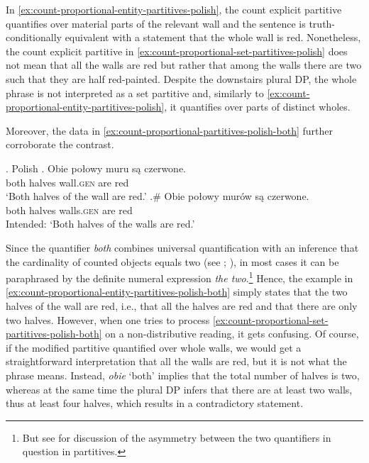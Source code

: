 In \ref{ex:count-proportional-entity-partitives-polish}, the count explicit partitive quantifies over material parts of the relevant wall and the sentence is truth-conditionally equivalent with a statement that the whole wall is red. Nonetheless, the count explicit partitive in \ref{ex:count-proportional-set-partitives-polish} does not mean that all the walls are red but rather that among the walls there are two such that they are half red-painted. Despite the downstairs plural DP, the whole phrase is not interpreted as a set partitive and, similarly to \ref{ex:count-proportional-entity-partitives-polish}, it quantifies over parts of distinct wholes.   

Moreover, the data in \ref{ex:count-proportional-partitives-polish-both} further corroborate the contrast.  

\ex.\label{ex:count-proportional-partitives-polish-both} Polish
\ag. Obie połowy muru są czerwone.\label{ex:count-proportional-entity-partitives-polish-both}\\
both halves wall\textsc{.gen} are red\\
`Both halves of the wall are red.'
\bg.\# Obie połowy murów są czerwone.\label{ex:count-proportional-set-partitives-polish-both}\\
both halves walls\textsc{.gen} are red\\
Intended: `Both halves of the walls are red.'

Since the quantifier \textit{both} combines universal quantification with an inference that the cardinality of counted objects equals two (see \citealt{barwise_cooper1981generalized}; \citealt[pp. 139--145]{schwarzschild1996pluralities}), in most cases it can be paraphrased by the definite numeral expression \textit{the two}.\footnote{But see \citet{ladusaw1982semantic} for discussion of the asymmetry between the two quantifiers in question in partitives.} Hence, the example in \ref{ex:count-proportional-entity-partitives-polish-both} simply states that the two halves of the wall are red, i.e., that all the halves are red and that there are only two halves. However, when one tries to process \ref{ex:count-proportional-set-partitives-polish-both} on a non-distributive reading, it gets confusing. Of course, if the modified partitive quantified over whole walls, we would get a straightforward interpretation that all the walls are red, but it is not what the phrase means. Instead, \textit{obie} `both' implies that the total number of halves is two, whereas at the same time the plural DP infers that there are at least two walls, thus at least four halves, which results in a contradictory statement.

